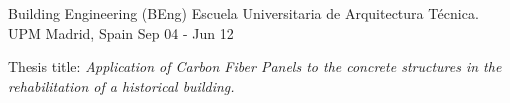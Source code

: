 

\begin{cventries}

  \cventry
    {Building Engineering (BEng)} %
    {Escuela Universitaria de Arquitectura Técnica. UPM} %
    {Madrid, Spain} %
    {Sep 04 - Jun 12} %
    { 
        \begin{cvitems} %
            \item {Thesis title: \textit{Application of Carbon Fiber Panels to the concrete structures in the rehabilitation of a historical building.}}
        \end{cvitems}
    }

\end{cventries}

